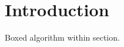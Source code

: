 \documentclass{article}
\begin{document}
\listofalgorithms

\section{Introduction}

\begin{algorithm}[h]
\caption{Sectional algorithm}\label{alg:sec}
Boxed algorithm within section.
\end{algorithm}
\end{document}
